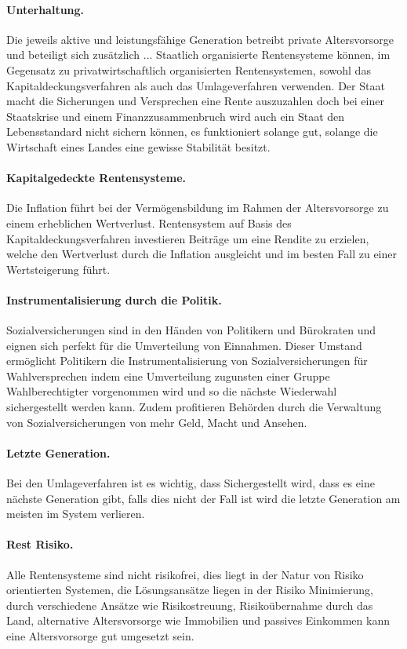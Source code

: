 \paragraph{Unterhaltung.} Die jeweils aktive und leistungsfähige Generation betreibt private Altersvorsorge und beteiligt sich zusätzlich ...
Staatlich organisierte Rentensysteme können, im Gegensatz zu privatwirtschaftlich organisierten Rentensystemen, sowohl das Kapitaldeckungsverfahren als auch das Umlageverfahren verwenden. 
Der Staat macht die Sicherungen und Versprechen eine Rente auszuzahlen doch bei einer Staatskrise und einem Finanzzusammenbruch wird auch ein Staat den Lebensstandard nicht sichern können, es funktioniert solange gut, solange die Wirtschaft eines Landes eine gewisse Stabilität besitzt.

\paragraph{Kapitalgedeckte Rentensysteme.} Die Inflation führt bei der Vermögensbildung im Rahmen der Altersvorsorge zu einem erheblichen Wertverlust. 
Rentensystem auf Basis des Kapitaldeckungsverfahren investieren Beiträge um eine Rendite zu erzielen, welche den Wertverlust durch die Inflation ausgleicht und im besten Fall zu einer Wertsteigerung führt.

\paragraph{Instrumentalisierung durch die Politik.} Sozialversicherungen sind in den Händen von Politikern und Bürokraten und eignen sich perfekt für die Umverteilung von Einnahmen. Dieser Umstand ermöglicht Politikern die Instrumentalisierung von Sozialversicherungen für Wahlversprechen indem eine Umverteilung zugunsten einer Gruppe Wahlberechtigter   vorgenommen wird und so die nächste Wiederwahl sichergestellt werden kann. Zudem profitieren Behörden durch die Verwaltung von Sozialversicherungen von mehr Geld, Macht und Ansehen. \cite{zweifel_insurance_2012}

\paragraph{Letzte Generation.} Bei den Umlageverfahren ist es wichtig, dass Sichergestellt wird, dass es eine nächste Generation gibt, falls dies nicht der Fall ist wird die letzte Generation am meisten im System verlieren.

\paragraph{Rest Risiko.} Alle Rentensysteme sind nicht risikofrei, dies liegt in der Natur von Risiko orientierten Systemen, die Lösungsansätze liegen in der Risiko Minimierung, durch verschiedene Ansätze wie Risikostreuung, Risikoübernahme durch das Land, alternative Altersvorsorge wie Immobilien und passives Einkommen kann eine Altersvorsorge gut umgesetzt sein.



